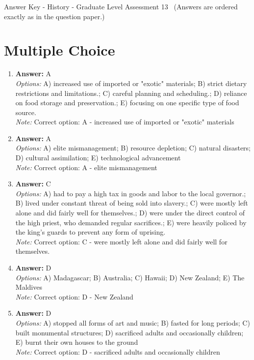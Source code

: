 \documentclass[12pt]{article}
\begin{document}
\begin{center}
Answer Key - History - Graduate Level Assessment 13 \
\small (Answers are ordered exactly as in the question paper.)
\end{center}

\section*{Multiple Choice}
\begin{enumerate}[label=\arabic*.]
\item \textbf{Answer:} A
\\ \textit{Options:} A) increased use of imported or "exotic" materials; B) strict dietary restrictions and limitations.; C) careful planning and scheduling.; D) reliance on food storage and preservation.; E) focusing on one specific type of food source.
\\ \textit{Note:} Correct option: A - increased use of imported or "exotic" materials
\item \textbf{Answer:} A
\\ \textit{Options:} A) elite mismanagement; B) resource depletion; C) natural disasters; D) cultural assimilation; E) technological advancement
\\ \textit{Note:} Correct option: A - elite mismanagement
\item \textbf{Answer:} C
\\ \textit{Options:} A) had to pay a high tax in goods and labor to the local governor.; B) lived under constant threat of being sold into slavery.; C) were mostly left alone and did fairly well for themselves.; D) were under the direct control of the high priest, who demanded regular sacrifices.; E) were heavily policed by the king's guards to prevent any form of uprising.
\\ \textit{Note:} Correct option: C - were mostly left alone and did fairly well for themselves.
\item \textbf{Answer:} D
\\ \textit{Options:} A) Madagascar; B) Australia; C) Hawaii; D) New Zealand; E) The Maldives
\\ \textit{Note:} Correct option: D - New Zealand
\item \textbf{Answer:} D
\\ \textit{Options:} A) stopped all forms of art and music; B) fasted for long periods; C) built monumental structures; D) sacrificed adults and occasionally children; E) burnt their own houses to the ground
\\ \textit{Note:} Correct option: D - sacrificed adults and occasionally children
\end{enumerate}
\end{document}
